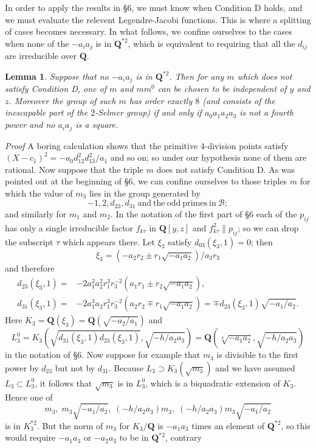 \documentclass[12pt]{article}
\def\bQ{{\mathbf Q}}
\def\sB{{\mathcal B}}
\def\ble{\begin{lemma} \label}
\def\ele{\end{lemma}}
\newtheorem{lemma}{Lemma}
\begin{document}
In order to apply the results in \S6, we must know when
Condition D
holds, and we must evaluate the relevent Legendre-Jacobi
functions. This is where a splitting of cases becomes
necessary. In what follows, we confine ourselves to the cases
when none of the $-a_ia_j$ is in $\bQ^{*2}$, which is
equivalent to requiring that all the $d_{ij}$ are irreducible
over $\bQ$.
\ble{L21} Suppose that no $-a_ia_j$ is in $\bQ^{*2}$. Then for
any $m$ which does not satisfy Condition D, one of $m$ and
$mm^0$ can be chosen to be independent of $y$ and $z$.
Moreover the group of such $m$ has order exactly $8$ (and
consists of the inescapable part of the $2$-Selmer group) if
and only if $a_0a_1a_2a_3$ is not a fourth power and no
$a_ia_j$ is a square.
\ele
\emph{Proof} A boring calculation shows that the primitive
4-division points satisfy $(X-c_1)^2=-a_0d^2_{12}d^2_{13}/a_1$
and so on; so under our hypothesis none of them are rational.
Now suppose that the triple $m$ does not satisfy Condition D.
As was pointed out at the beginning of \S6, we can confine
ourselves to those triples $m$ for which the
value of $m_3$ lies in the group generated by
\[ -1,2,d_{23},d_{31} \mathrm{~and~the~odd~primes~in~} \sB; \]
and similarly for $m_1$ and $m_2$. In the notation of the
first part of \S6 each of the $p_{ij}$ has only a single
irreducible factor $f_{k\tau}$ in $\bQ[y,z]$ and $f_{k\tau}^2
\|p_{ij}$; so we can drop the subscript
$\tau$ which appears there. Let $\xi_3$ satisfy
$d_{03}(\xi_3,1)=0$; then
\[ \xi_3=(-a_2r_2\pm r_1\sqrt{-a_1a_2})/a_3r_3 \]
and therefore
\begin{align*}
d_{23}(\xi_3,1)= & -2a_1^2a_2^2r_1^3r_3^{-2}(a_1r_1\pm r_2\sqrt{-a_1a_2}), \\
d_{31}(\xi_3,1)= & -2a_1^3a_2r_1^3r_3^{-2}(a_2r_2\mp r_1\sqrt{-a_1a_2})=\mp d_{23}(\xi_3,1)\sqrt{-a_1/a_2}.
\end{align*}
Here $K_3=\bQ(\xi_3)=\bQ(\sqrt{-a_2/a_1})$ and
\[ L_3^0=K_3(\sqrt{d_{31}(\xi_3,1)d_{23}(\xi_3,1)},
\sqrt{-h/a_2a_3})=\bQ(\sqrt[4]{-a_1a_2},\sqrt{-h/a_2a_3}) \]
in the notation of \S6. Now suppose for example
that $m_3$ is divisible to
the first power by $d_{23}$ but not by $d_{31}$. Because
$L_3\supset K_3(\sqrt{m_3})$ and we have assumed $L_3\subset
L^0_3$, it follows that $\sqrt{m_3}$ is in $L^0_3$, which is
a biquadratic extension of $K_3$. Hence one of
\[ m_3,\;m_3\sqrt{-a_1/a_2},\;(-h/a_2a_3)m_3,\;(-h/a_2a_3)m_3\sqrt{-a_1/a_2} \]
is in $K_3^{*2}$. But the norm of $m_3$ for $K_3/\bQ$ is
$-a_1a_3$ times an element of $\bQ^{*2}$, so this would
require $-a_1a_3$ or $-a_2a_3$ to be in $\bQ^{*2}$, contrary
\end{document}
